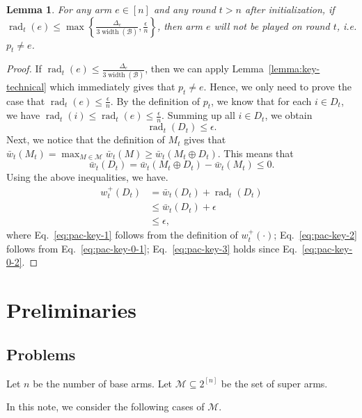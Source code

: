 \documentclass{article}
\newtheorem{lemma}{Lemma}
\newcommand{\M}{\mathcal M}
\newcommand{\B}{\mathcal B}
\DeclareMathOperator{\rank}{width}
\DeclareMathOperator{\rad}{rad}
\begin{document}
\begin{spacing}{1.1}
\begin{lemma}
For any arm $e \in [n]$ and any round $t > n$ after initialization, if $\rad_t(e) \le \max\left\{\frac{\Delta_e}{3\rank(\B)}, \frac{\epsilon}{n}\right\}$,
then arm $e$ will not be played on round $t$, i.e. $p_t\not= e$.
\end{lemma}
\begin{proof}
If $\rad_t(e) \le \frac{\Delta_e}{3\rank(\B)}$, then we can apply Lemma~\ref{lemma:key-technical} which immediately gives that $p_t\not= e$.
Hence, we only need to prove the case that $\rad_t(e) \le \frac{\epsilon}{n}$.
By the definition of $p_t$, we know that for each $i\in D_t$, we have $\rad_t(i) \le \rad_t(e) \le \frac{\epsilon}{n}$.
Summing up all $i\in D_t$, we obtain
\begin{equation}
\rad_t(D_t) \le \epsilon.
\label{eq:pac-key-0-1}
\end{equation}
Next, we notice that the definition of $M_t$ gives that $\bar w_t(M_t)=\max_{M\in \M} \bar w_t(M) \ge \bar w_t(M_t \oplus D_t)$.
This means that
\begin{equation}
\bar w_t(D_t) = \bar w_t(M_t\oplus D_t)-\bar w_t(M_t) \le 0.
\label{eq:pac-key-0-2}
\end{equation}
Using the above inequalities, we have.
\begin{align}
  w_t^+(D_t) &= \bar w_t(D_t)+\rad_t(D_t) \label{eq:pac-key-1}\\
  			 &\le \bar w_t(D_t)+\epsilon \label{eq:pac-key-2}\\
  			 &\le \epsilon, \label{eq:pac-key-3}
\end{align}
where Eq.~\eqref{eq:pac-key-1} follows from the definition of $w_t^+(\cdot)$; 
Eq.~\eqref{eq:pac-key-2} follows from Eq.~\eqref{eq:pac-key-0-1};
Eq.~\eqref{eq:pac-key-3} holds since Eq.~\eqref{eq:pac-key-0-2}.
\end{proof}

\section{Preliminaries}

\subsection{Problems}

Let $n$ be the number of base arms. 
Let $\M \subseteq 2^{[n]}$ be the set of super arms. 


In this note, we consider the following cases of $\M$.


\end{spacing}
\end{document}
